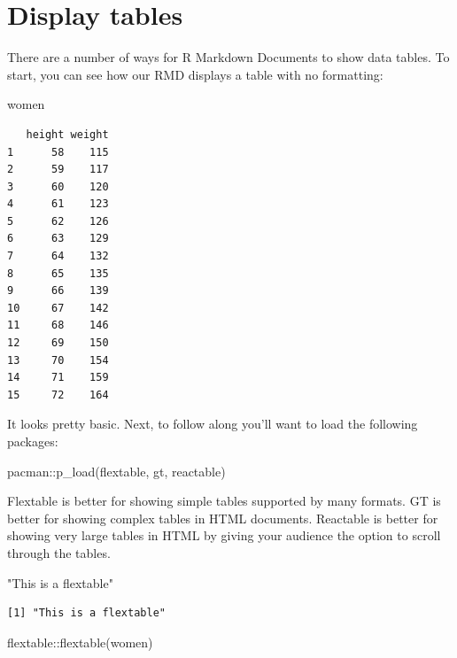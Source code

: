 \documentclass[
  letterpaper,
  DIV=11,
  numbers=noendperiod]{scrreprt}
\newenvironment{Shaded}{\begin{snugshade}}{\end{snugshade}}
\newcommand{\FunctionTok}[1]{\textcolor[rgb]{0.28,0.35,0.67}{#1}}
\newcommand{\NormalTok}[1]{\textcolor[rgb]{0.00,0.23,0.31}{#1}}
\newcommand{\SpecialCharTok}[1]{\textcolor[rgb]{0.37,0.37,0.37}{#1}}
\newcommand{\StringTok}[1]{\textcolor[rgb]{0.13,0.47,0.30}{#1}}
\begin{document}
\section{Display tables}\label{display-tables}

There are a number of ways for R Markdown Documents to show data tables.
To start, you can see how our RMD displays a table with no formatting:

\begin{Shaded}
\begin{Highlighting}[]
\NormalTok{women}
\end{Highlighting}
\end{Shaded}

\begin{verbatim}
   height weight
1      58    115
2      59    117
3      60    120
4      61    123
5      62    126
6      63    129
7      64    132
8      65    135
9      66    139
10     67    142
11     68    146
12     69    150
13     70    154
14     71    159
15     72    164
\end{verbatim}

It looks pretty basic. Next, to follow along you'll want to load the
following packages:

\begin{Shaded}
\begin{Highlighting}[]
\NormalTok{pacman}\SpecialCharTok{::}\FunctionTok{p\_load}\NormalTok{(flextable, gt, reactable)}
\end{Highlighting}
\end{Shaded}

Flextable is better for showing simple tables supported by many formats.
GT is better for showing complex tables in HTML documents. Reactable is
better for showing very large tables in HTML by giving your audience the
option to scroll through the tables.

\begin{Shaded}
\begin{Highlighting}[]
\StringTok{"This is a flextable"}
\end{Highlighting}
\end{Shaded}

\begin{verbatim}
[1] "This is a flextable"
\end{verbatim}

\begin{Shaded}
\begin{Highlighting}[]
\NormalTok{flextable}\SpecialCharTok{::}\FunctionTok{flextable}\NormalTok{(women)}
\end{Highlighting}
\end{Shaded}
\end{document}
